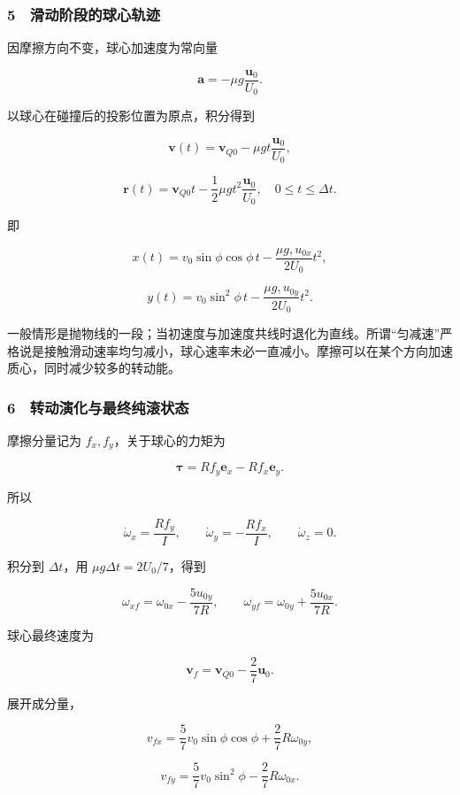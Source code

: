 \documentclass[12pt,a4paper,fontset=fandol]{ctexart}
\begin{document}
\subsubsection{5　滑动阶段的球心轨迹}\label{ux6ed1ux52a8ux9636ux6bb5ux7684ux7403ux5fc3ux8f68ux8ff9}

因摩擦方向不变，球心加速度为常向量

\[\boldsymbol a=-\mu g\frac{\boldsymbol u_0}{U_0}.\]

以球心在碰撞后的投影位置为原点，积分得到

\[\boldsymbol v(t)=\boldsymbol v_{Q0}
-\mu gt\frac{\boldsymbol u_0}{U_0},\]

\[\boxed{\boldsymbol r(t)=\boldsymbol v_{Q0}t
-\frac12\mu gt^2\frac{\boldsymbol u_0}{U_0},
\quad0\le t\le\Delta t.}\]

即

\[\boxed{x(t)=v_0\sin\phi\cos\phi\,t
-\frac{\mu g,u_{0x}}{2U_0}t^2,}\]

\[\boxed{y(t)=v_0\sin^2\phi\,t
-\frac{\mu g,u_{0y}}{2U_0}t^2.}\]

一般情形是抛物线的一段；当初速度与加速度共线时退化为直线。所谓``匀减速''严格说是接触滑动速率均匀减小，球心速率未必一直减小。摩擦可以在某个方向加速质心，同时减少较多的转动能。

\subsubsection{6　转动演化与最终纯滚状态}\label{ux8f6cux52a8ux6f14ux5316ux4e0eux6700ux7ec8ux7eafux6edaux72b6ux6001}

摩擦分量记为 \(f_x,f_y\)，关于球心的力矩为

\[\boldsymbol\tau=R f_y\boldsymbol e_x-R f_x\boldsymbol e_y.\]

所以

\[\dot\omega_x=\frac{R f_y}{I},
\qquad\dot\omega_y=-\frac{R f_x}{I},
\qquad\dot\omega_z=0.\]

积分到 \(\Delta t\)，用 \(\mu g\Delta t=2U_0/7\)，得到

\[\omega_{xf}=\omega_{0x}-\frac{5u_{0y}}{7R},
\qquad\omega_{yf}=\omega_{0y}+\frac{5u_{0x}}{7R}.\]

球心最终速度为

\[\boxed{\boldsymbol v_f=\boldsymbol v_{Q0}-\frac27\boldsymbol u_0.}\]

展开成分量，

\[\boxed{v_{fx}=\frac57v_0\sin\phi\cos\phi
+\frac27R\omega_{0y},}\]

\[\boxed{v_{fy}=\frac57v_0\sin^2\phi
-\frac27R\omega_{0x}.}\]
\end{document}
